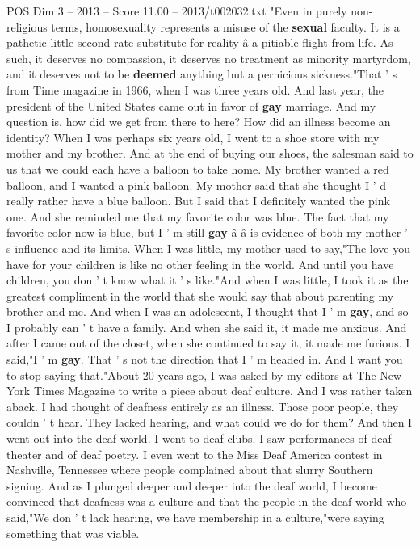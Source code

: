\begin{textsample}{POS Dim 3 – 2013 – Score 11.00 – 2013/t002032.txt}  \label{ex:f3_pos_052}
"Even in purely non-religious terms, homosexuality represents a misuse of the \textbf{sexual} faculty.
It is a pathetic little second-rate substitute for reality â a pitiable flight from life.
As such, it deserves no compassion, it deserves no treatment as minority martyrdom, and it deserves not to be \textbf{deemed} anything but a pernicious sickness."That ' s from Time magazine in 1966, when I was three years old.
And last year, the president of the United States came out in favor of \textbf{gay} marriage.
And my question is, how did we get from there to here?
How did an illness become an identity?
When I was perhaps six years old, I went to a shoe store with my mother and my brother.
And at the end of buying our shoes, the salesman said to us that we could each have a balloon to take home.
My brother wanted a red balloon, and I wanted a pink balloon.
My mother said that she thought I ' d really rather have a blue balloon.
But I said that I definitely wanted the pink one.
And she reminded me that my favorite color was blue.
The fact that my favorite color now is blue, but I ' m still \textbf{gay} â â is evidence of both my mother ' s influence and its limits.
When I was little, my mother used to say,"The love you have for your children is like no other feeling in the world.
And until you have children, you don ' t know what it ' s like."And when I was little, I took it as the greatest compliment in the world that she would say that about parenting my brother and me.
And when I was an adolescent, I thought that I ' m \textbf{gay}, and so I probably can ' t have a family.
And when she said it, it made me anxious.
And after I came out of the closet, when she continued to say it, it made me furious.
I said,"I ' m \textbf{gay}.
That ' s not the direction that I ' m headed in.
And I want you to stop saying that."About 20 years ago, I was asked by my editors at The New York Times Magazine to write a piece about deaf culture.
And I was rather taken aback.
I had thought of deafness entirely as an illness.
Those poor people, they couldn ' t hear.
They lacked hearing, and what could we do for them?
And then I went out into the deaf world.
I went to deaf clubs.
I saw performances of deaf theater and of deaf poetry.
I even went to the Miss Deaf America contest in Nashville, Tennessee where people complained about that slurry Southern signing.
And as I plunged deeper and deeper into the deaf world, I become convinced that deafness was a culture and that the people in the deaf world who said,"We don ' t lack hearing, we have membership in a culture,"were saying something that was viable.

\end{textsample}
